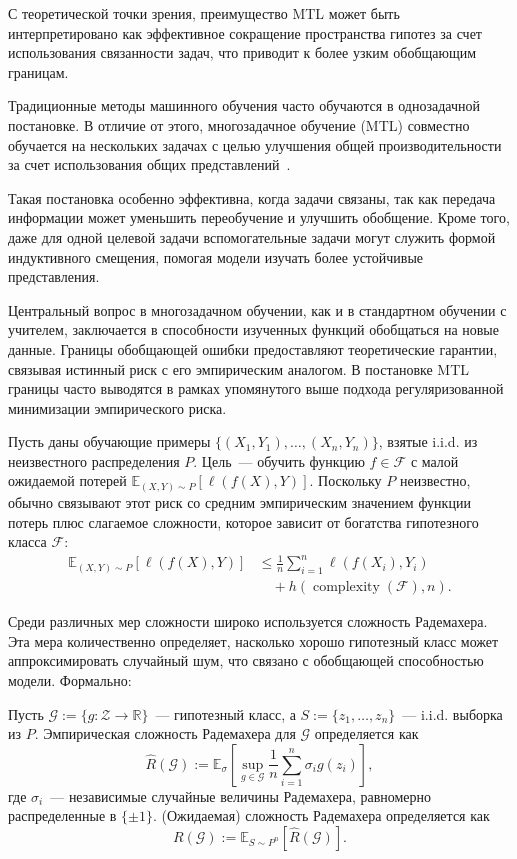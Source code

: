 С теоретической точки зрения, преимущество MTL может быть интерпретировано как эффективное сокращение пространства гипотез за счет использования связанности задач, что приводит к более узким обобщающим границам.

Традиционные методы машинного обучения часто обучаются в однозадачной постановке.
В отличие от этого, многозадачное обучение (MTL) совместно обучается на нескольких задачах с целью улучшения общей производительности за счет использования общих представлений~\cite{anonymous2024}.

Такая постановка особенно эффективна, когда задачи связаны, так как передача информации может уменьшить переобучение и улучшить обобщение.
Кроме того, даже для одной целевой задачи вспомогательные задачи могут служить формой индуктивного смещения, помогая модели изучать более устойчивые представления.

Центральный вопрос в многозадачном обучении, как и в стандартном обучении с учителем, заключается в способности изученных функций обобщаться на новые данные.
Границы обобщающей ошибки предоставляют теоретические гарантии, связывая истинный риск с его эмпирическим аналогом.
В постановке MTL границы часто выводятся в рамках упомянутого выше подхода регуляризованной минимизации эмпирического риска.

Пусть даны обучающие примеры $\{(X_1, Y_1), \ldots, (X_n, Y_n)\}$, взятые i.i.d. из неизвестного распределения $P$.
Цель~--- обучить функцию $f \in \mathcal{F}$ с малой ожидаемой потерей $\mathbb{E}_{(X,Y) \sim P} [\ell(f(X), Y)]$.
Поскольку $P$ неизвестно, обычно связывают этот риск со средним эмпирическим значением функции потерь плюс слагаемое сложности, которое зависит от богатства гипотезного класса $\mathcal{F}$:
\begin{align}
    \mathbb{E}_{(X,Y) \sim P}[\ell(f(X), Y)] &\leq \frac{1}{n} \sum_{i=1}^{n} \ell(f(X_i), Y_i) \\
    &\quad + h\!\left(\operatorname{complexity}(\mathcal{F}), n \right).
\end{align}

Среди различных мер сложности широко используется сложность Радемахера.
Эта мера количественно определяет, насколько хорошо гипотезный класс может аппроксимировать случайный шум, что связано с обобщающей способностью модели.
Формально:

\begin{definition}
    Пусть $\mathcal{G} := \{g : \mathcal{Z} \to \mathbb{R}\}$~--- гипотезный класс, а $S := \{z_1, \ldots, z_n\}$~--- i.i.d. выборка из $P$.
    Эмпирическая сложность Радемахера для $\mathcal{G}$ определяется как
    \[
    \widehat{R}(\mathcal{G}) := \mathbb{E}_{\sigma} \left[
        \sup_{g \in \mathcal{G}} \frac{1}{n} \sum_{i=1}^n \sigma_i g(z_i) \right],
    \]
    где $\sigma_i$~--- независимые случайные величины Радемахера, равномерно распределенные в $\{\pm 1\}$.
    (Ожидаемая) сложность Радемахера определяется как
    \[
    R(\mathcal{G}) := \mathbb{E}_{S \sim P^n} \left[ \widehat{R}(\mathcal{G}) \right].
    \]
\end{definition}

